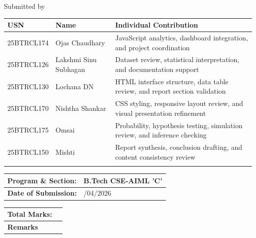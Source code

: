 \documentclass[12pt,a4paper]{article}
\begin{document}
\begin{center}
{Submitted by}
\end{center}
\renewcommand{\arraystretch}{1.1}
\begin{center}
\begin{tabular}{|p{4cm}|p{4cm}|p{6cm}|}
\hline
\textbf{USN} & \textbf{Name} & \textbf{Individual Contribution} \\
\hline
25BTRCL174 & Ojas Chaudhary & JavaScript analytics, dashboard integration, and project coordination \\
\hline
25BTRCL126 & Lakshmi Sinu Subhagan & Dataset review, statistical interpretation, and documentation support \\
\hline
25BTRCL130 & Lochana DN & HTML interface structure, data table review, and report section validation \\
\hline
25BTRCL170 & Nishtha Shankar & CSS styling, responsive layout review, and visual presentation refinement \\
\hline
25BTRCL175 & Omsai & Probability, hypothesis testing, simulation review, and inference checking \\
\hline
25BTRCL150 & Mishti & Report synthesis, conclusion drafting, and content consistency review \\
\hline
 &  &  \\
\hline
\end{tabular}
\end{center}


\newpage



\vspace{0.15cm}

\begin{center}
\begin{tabular}{|p{7cm}|>{\centering\arraybackslash}p{7cm}|}
\hline
\textbf{Program \& Section:} & B.Tech CSE-AIML 'C' \\
\hline
\textbf{Date of Submission:} & 13/04/2026 \\
\hline
\end{tabular}
\end{center}

\begin{center}
\begin{tabular}{|p{7cm}|>{\centering\arraybackslash}p{7cm}|}
\hline
\textbf{Total Marks:} &  \\
\hline
\textbf{Remarks} &  \\
\hline
\end{tabular}
\end{center}
\end{document}
